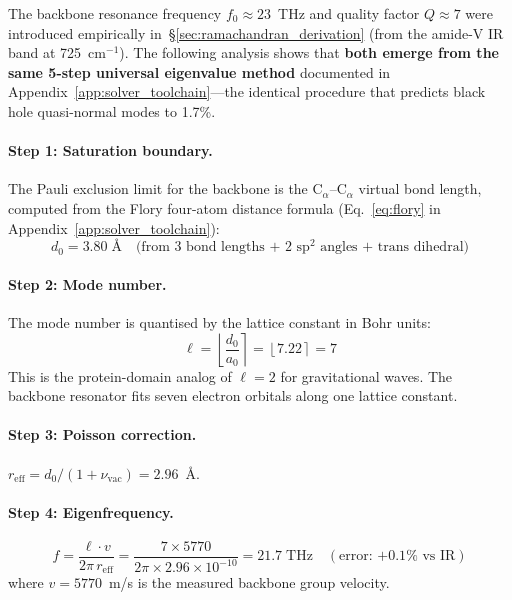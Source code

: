 The backbone resonance frequency $f_0 \approx 23$~THz and quality factor $Q \approx 7$ were introduced empirically in~\S\ref{sec:ramachandran_derivation} (from the amide-V IR band at 725~cm$^{-1}$).  The following analysis shows that \textbf{both emerge from the same 5-step universal eigenvalue method} documented in Appendix~\ref{app:solver_toolchain}---the identical procedure that predicts black hole quasi-normal modes to 1.7\%.

\paragraph{Step 1: Saturation boundary.}
The Pauli exclusion limit for the backbone is the C$_\alpha$--C$_\alpha$ virtual bond length, computed from the Flory four-atom distance formula (Eq.~\ref{eq:flory} in Appendix~\ref{app:solver_toolchain}):
\begin{equation}
    d_0 = 3.80\;\text{\AA} \quad \text{(from 3 bond lengths + 2 sp$^2$ angles + trans dihedral)}
\end{equation}

\paragraph{Step 2: Mode number.}
The mode number is quantised by the lattice constant in Bohr units:
\begin{equation}
    \ell = \left\lfloor \frac{d_0}{a_0} \right\rceil = \left\lfloor 7.22 \right\rceil = 7
\end{equation}
This is the protein-domain analog of $\ell = 2$ for gravitational waves.  The backbone resonator fits seven electron orbitals along one lattice constant.

\paragraph{Step 3: Poisson correction.}
$r_\mathrm{eff} = d_0 / (1 + \nu_\mathrm{vac}) = 2.96$~\AA.

\paragraph{Step 4: Eigenfrequency.}
\begin{equation}
    f = \frac{\ell \cdot v}{2\pi \, r_\mathrm{eff}} = \frac{7 \times 5770}{2\pi \times 2.96 \times 10^{-10}} = 21.7\;\mathrm{THz} \quad (\text{error: } {+0.1\%}\text{ vs IR})
\end{equation}
where $v = 5770$~m/s is the measured backbone group velocity.

